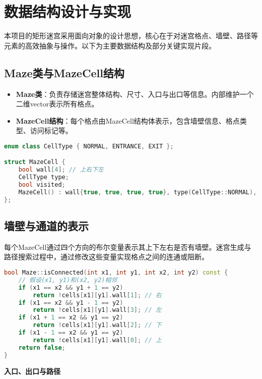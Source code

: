 \documentclass[UTF8]{ctexart}
\begin{document}
\newpage
\section{数据结构设计与实现}

本项目的矩形迷宫采用面向对象的设计思想，核心在于对迷宫格点、墙壁、路径等元素的高效抽象与操作。以下为主要数据结构及部分关键实现片段。

\subsection{Maze类与MazeCell结构}

\begin{itemize}
    \item \textbf{Maze类}：负责存储迷宫整体结构、尺寸、入口与出口等信息。内部维护一个二维vector表示所有格点。
    \item \textbf{MazeCell结构}：每个格点由MazeCell结构体表示，包含墙壁信息、格点类型、访问标记等。
\end{itemize}

\begin{lstlisting}[language=C++, caption={MazeCell结构体定义}]
enum class CellType { NORMAL, ENTRANCE, EXIT };

struct MazeCell {
    bool wall[4]; // 上右下左
    CellType type;
    bool visited;
    MazeCell() : wall{true, true, true, true}, type(CellType::NORMAL), visited(false) {}
};
\end{lstlisting}

\subsection{墙壁与通道的表示}

每个MazeCell通过四个方向的布尔变量表示其上下左右是否有墙壁。迷宫生成与路径搜索过程中，通过修改这些变量实现格点之间的连通或阻断。

\begin{lstlisting}[language=C++, caption={判断相邻格点是否连通}]
bool Maze::isConnected(int x1, int y1, int x2, int y2) const {
    // 假设(x1, y1)和(x2, y2)相邻
    if (x1 == x2 && y1 + 1 == y2)
        return !cells[x1][y1].wall[1]; // 右
    if (x1 == x2 && y1 - 1 == y2)
        return !cells[x1][y1].wall[3]; // 左
    if (x1 + 1 == x2 && y1 == y2)
        return !cells[x1][y1].wall[2]; // 下
    if (x1 - 1 == x2 && y1 == y2)
        return !cells[x1][y1].wall[0]; // 上
    return false;
}
\end{lstlisting}

\textbf{入口、出口与路径}
\end{document}
